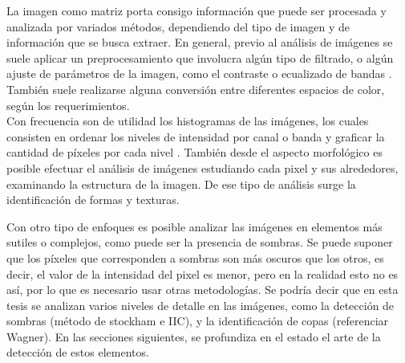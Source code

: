 La imagen como matriz porta consigo información que puede ser procesada y analizada por variados métodos, dependiendo del tipo de imagen y de información que se busca extraer. En general, previo al análisis de imágenes se suele aplicar un preprocesamiento que involucra algún tipo de filtrado, o algún ajuste de parámetros de la imagen, como el contraste o ecualizado de bandas \cite{sonka_image_1993}. También suele realizarse alguna conversión entre diferentes espacios de color, según los requerimientos.\\

Con frecuencia son de utilidad los histogramas de las imágenes, los cuales consisten en ordenar los niveles de intensidad por canal o banda y graficar la cantidad de píxeles por cada nivel \cite{atienza_histograma_nodate}. También desde el aspecto morfológico es posible efectuar el análisis de imágenes estudiando cada pixel y sus alrededores, examinando la estructura de la imagen. De ese tipo de análisis surge la identificación de formas y texturas.

Con otro tipo de enfoques es posible analizar las imágenes en elementos más sutiles o complejos, como puede ser la presencia de sombras. Se puede suponer que los píxeles que corresponden a sombras son más oscuros que los otros, es decir, el valor de la intensidad del pixel es menor, pero en la realidad esto no es así, por lo que es necesario usar otras metodologías. 
Se podría decir que en esta tesis se analizan varios niveles de detalle en las imágenes, como la detección de sombras (método de stockham e IIC), y la identificación de copas (referenciar Wagner).
En las secciones siguientes, se profundiza en el estado el arte de la detección de estos elementos.

